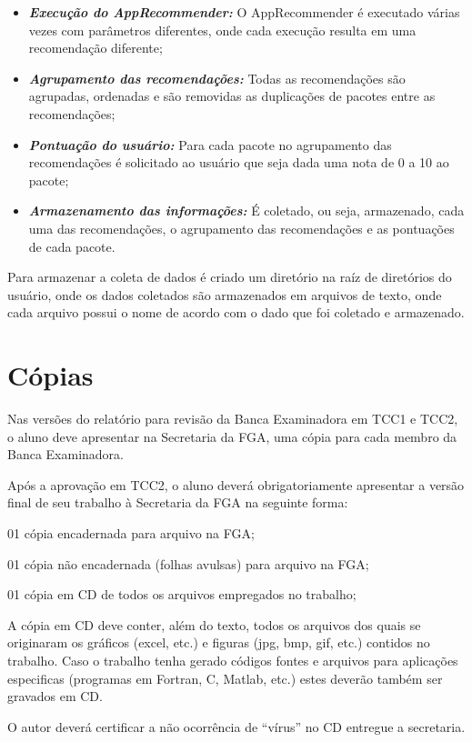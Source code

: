 \begin{itemize}
    \item \textit{\textbf{Execução do AppRecommender:}} O AppRecommender é executado várias vezes com parâmetros diferentes, onde cada execução resulta em uma recomendação diferente;
    \item \textit{\textbf{Agrupamento das recomendações:}} Todas as recomendações são agrupadas, ordenadas e são removidas as duplicações de pacotes entre as recomendações;
    \item \textit{\textbf{Pontuação do usuário:}} Para cada pacote no agrupamento das recomendações é solicitado ao usuário que seja dada uma nota de 0 a 10 ao pacote;
    \item \textit{\textbf{Armazenamento das informações:}} É coletado, ou seja, armazenado, cada uma das recomendações, o agrupamento das recomendações e as pontuações de cada pacote.
\end{itemize}

Para armazenar a coleta de dados é criado um diretório na raíz de diretórios
do usuário, onde os dados coletados são
armazenados em arquivos de texto, onde cada arquivo possui o nome de acordo
com o dado que foi coletado e armazenado.


\section{Cópias}

Nas versões do relatório para revisão da Banca Examinadora em TCC1 e TCC2,
o aluno deve apresentar na Secretaria da FGA, uma cópia para cada membro da
Banca Examinadora.

Após a aprovação em TCC2, o aluno deverá obrigatoriamente apresentar a
versão final de seu trabalho à Secretaria da FGA na seguinte forma:

\begin{description}
	\item 01 cópia encadernada para arquivo na FGA;
	\item 01 cópia não encadernada (folhas avulsas) para arquivo na FGA;
	\item 01 cópia em CD de todos os arquivos empregados no trabalho;
\end{description}

A cópia em CD deve conter, além do texto, todos os arquivos dos quais se
originaram os gráficos (excel, etc.) e figuras (jpg, bmp, gif, etc.)
contidos no trabalho. Caso o trabalho tenha gerado códigos fontes e
arquivos para aplicações especificas (programas em Fortran, C, Matlab,
etc.) estes deverão também ser gravados em CD.

O autor deverá certificar a não ocorrência de “vírus” no CD entregue a
secretaria.

